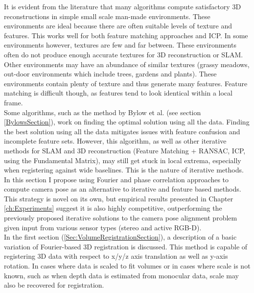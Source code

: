 
It is evident from the literature that many algorithms compute satisfactory 3D reconstructions in simple small scale man-made environments. These environments are ideal because there are often suitable levels of texture and features. This works well for both feature matching approaches and ICP. In some environments however, textures are few and far between. These environments often do not produce enough accurate textures for 3D reconstruction or SLAM. \\

Other environments may have an abundance of similar textures (grassy meadows, out-door environments which include trees, gardens and plants). These environments contain plenty of texture and thus generate many features. Feature matching is difficult though, as features tend to look identical within a local frame. \\

Some algorithms, such as the method by Bylow et al. (see section \ref{BylowsSection}), work on finding the optimal solution using all the data. Finding the best solution using all the data mitigates issues with feature confusion and incomplete feature sets. However, this algorithm, as well as other iterative methods for SLAM and 3D reconstruction (Feature Matching + RANSAC, ICP, using the Fundamental Matrix), may still get stuck in local extrema, especially when registering against wide baselines. This is the nature of iterative methods. \\

In this section I propose using Fourier and phase correlation approaches to compute camera pose as an alternative to iterative and feature based methods. This strategy is novel on its own, but empirical results presented in Chapter \ref{ch:Experiments} suggest it is also highly competitive, outperforming the previously proposed iterative solutions to the camera pose alignment problem given input from various sensor types (stereo and active RGB-D). \\

In the first section (\ref{Sec:VolumeRegistrationSection}), a description of a basic variation of Fourier-based 3D registration is discussed. This method is capable of registering 3D data with respect to x/y/z axis translation as well as y-axis rotation. In cases where data is scaled to fit volumes or in cases where scale is not known, such as when depth data is estimated from monocular data, scale may also be recovered for registration. \\

